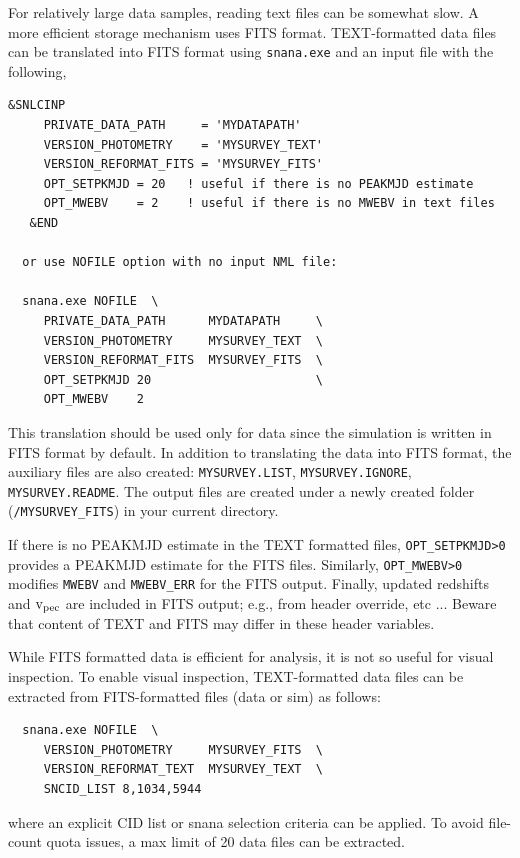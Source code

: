 \documentclass[12pt]{article}
\newcommand{\vpec}{{\rm v}_{\rm pec}}
\begin{document}
For relatively large data samples,
reading text files can be somewhat slow.
A more efficient storage mechanism uses FITS format.
TEXT-formatted data files can be translated into
FITS format using {\tt snana.exe} and an input
file with the following,
%
\begin{Verbatim}[frame=single]
  &SNLCINP
     PRIVATE_DATA_PATH     = 'MYDATAPATH' 
     VERSION_PHOTOMETRY    = 'MYSURVEY_TEXT'
     VERSION_REFORMAT_FITS = 'MYSURVEY_FITS'
     OPT_SETPKMJD = 20   ! useful if there is no PEAKMJD estimate
     OPT_MWEBV    = 2    ! useful if there is no MWEBV in text files
   &END

  or use NOFILE option with no input NML file:

  snana.exe NOFILE  \
     PRIVATE_DATA_PATH      MYDATAPATH     \
     VERSION_PHOTOMETRY     MYSURVEY_TEXT  \  
     VERSION_REFORMAT_FITS  MYSURVEY_FITS  \
     OPT_SETPKMJD 20                       \ 
     OPT_MWEBV    2
\end{Verbatim}
%
This translation should be used only for data
since the simulation is written in FITS format by default.
In addition to translating the data into FITS format,
the auxiliary files are also created: 
{\tt MYSURVEY.LIST}, 
{\tt MYSURVEY.IGNORE}, 
{\tt MYSURVEY.README}.
The output files are created under a newly created folder 
({\tt /MYSURVEY\_FITS}) in your current directory.

If there is no PEAKMJD estimate in the TEXT formatted files,
{\tt OPT\_SETPKMJD>0} provides a PEAKMJD estimate for the FITS files.
Similarly, {\tt OPT\_MWEBV>0} modifies {\tt MWEBV} and {\tt MWEBV\_ERR}
for the FITS output. Finally, updated redshifts and $\vpec$
are included in FITS output; e.g., from header override, etc ...
Beware that content of TEXT and FITS may differ in these header variables.

\medskip
While FITS formatted data is efficient for analysis,
it is not so useful for visual inspection. 
To enable visual inspection, TEXT-formatted
data files can be extracted from FITS-formatted files
(data or sim) as follows:
\begin{verbatim}
  snana.exe NOFILE  \
     VERSION_PHOTOMETRY     MYSURVEY_FITS  \  
     VERSION_REFORMAT_TEXT  MYSURVEY_TEXT  \
     SNCID_LIST 8,1034,5944
\end{verbatim}
%
where an explicit CID list or snana selection criteria can 
be applied. To avoid file-count quota issues, 
a max limit of 20 data files can be extracted.
\end{document}

